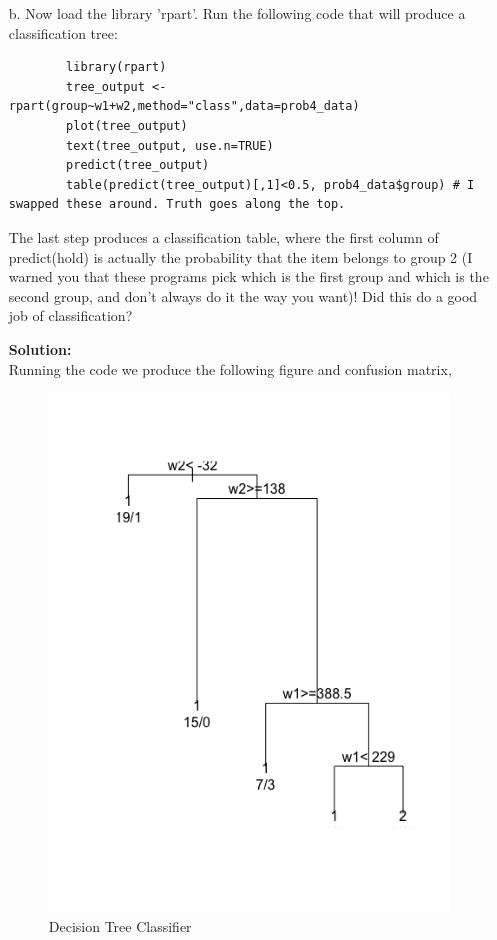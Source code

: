 \documentclass[12pt]{article}
\makeatletter
\theoremstyle{homework}
\newenvironment{exercise}[1]
{\def\@currentlabel{#1}\exercisecore}
{\endexercisecore}
\newcommand{\localhead}[1]{\par\smallskip\noindent\textbf{#1}\nobreak\\}%
\newcommand\solution{\localhead{Solution:}}
\makeatother
\begin{document}
\begin{exercise}{4}
\begin{enumerate}
    \item[b.] Now load the library 'rpart'. Run the following code that will produce a classification tree:\\
      \begin{footnotesize}
      \begin{verbatim}
        library(rpart)
        tree_output <- rpart(group~w1+w2,method="class",data=prob4_data)
        plot(tree_output)
        text(tree_output, use.n=TRUE)
        predict(tree_output)
        table(predict(tree_output)[,1]<0.5, prob4_data$group) # I swapped these around. Truth goes along the top. 
      \end{verbatim} 
      \end{footnotesize}
      The last step produces a classification table, where the first column of predict(hold) is actually the probability that the item belongs to group 2 (I
      warned you that these programs pick which is the first group and which is the second group, and don't always do it the way you want)! Did this
      do a good job of classification?\\
      \solution Running the code we produce the following figure and confusion matrix, 
      \begin{figure}[H]
        \begin{center}
          \caption{Decision Tree Classifier}
        \includegraphics[width = \textwidth]{Rplot02.png}

\end{center}
\end{figure}
\end{enumerate}
\end{exercise}
\end{document}
